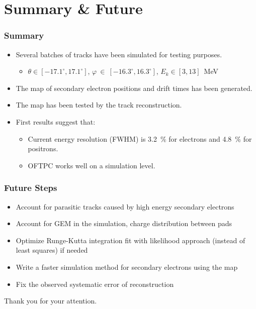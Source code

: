 \documentclass{beamer}
\begin{document}
	
	\section{Summary \& Future}	
	\begin{frame}
		\frametitle{Summary}
		\begin{itemize}
			\item Several batches of tracks have been simulated for testing purposes.
			\begin{itemize}
				\item $\theta\in[-17.1^\circ,17.1^\circ]$, $\varphi~\in~[-16.3^\circ,16.3^\circ]$, $ E_k \in [3,13] $~MeV
			\end{itemize}
			\item The map of secondary electron positions and drift times has been generated.
			\item The map has been tested by the track reconstruction.
			\item First results suggest that:
			\begin{itemize}
				\item Current energy resolution (FWHM) is 3.2~\% for electrons and 4.8~\% for positrons.
				\item OFTPC works well on a simulation level.
			\end{itemize}
		\end{itemize}
	\end{frame}
	\begin{frame}
		\frametitle{Future Steps}
		\begin{itemize}
			\item Account for parasitic tracks caused by high energy secondary electrons
			\item Account for GEM in the simulation, charge distribution between pads
			\item Optimize Runge-Kutta integration fit with likelihood approach (instead of least squares) if needed
			\item Write a faster simulation method for secondary electrons using the map
			\item Fix the observed systematic error of reconstruction
		\end{itemize}
	\end{frame}
	
	{
		\begin{frame}[noframenumbering]{}
			\begin{center}
				\Huge Thank you for your attention.
			\end{center}
		\end{frame}
	}
	
\end{document}
